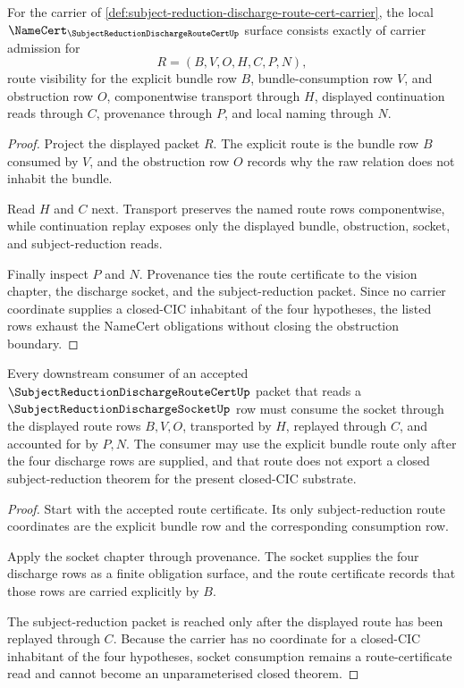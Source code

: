 \begin{theorem}
\label{thm:subject-reduction-discharge-route-cert-obligations}
For the carrier of \autoref{def:subject-reduction-discharge-route-cert-carrier}, the local $\NameCert_{\SubjectReductionDischargeRouteCertUp}$ surface consists exactly of carrier admission for
$$
R=(B,V,O,H,C,P,N),
$$
route visibility for the explicit bundle row $B$, bundle-consumption row $V$, and obstruction row $O$, componentwise transport through $H$, displayed continuation reads through $C$, provenance through $P$, and local naming through $N$.
\end{theorem}
\begin{proof}
Project the displayed packet $R$. The explicit route is the bundle row $B$ consumed by $V$, and the obstruction row $O$ records why the raw relation does not inhabit the bundle.

Read $H$ and $C$ next. Transport preserves the named route rows componentwise, while continuation replay exposes only the displayed bundle, obstruction, socket, and subject-reduction reads.

Finally inspect $P$ and $N$. Provenance ties the route certificate to the vision chapter, the discharge socket, and the subject-reduction packet. Since no carrier coordinate supplies a closed-CIC inhabitant of the four hypotheses, the listed rows exhaust the NameCert obligations without closing the obstruction boundary.
\end{proof}

\begin{theorem}
\label{thm:subject-reduction-discharge-route-cert-socket-consumption}
Every downstream consumer of an accepted $\SubjectReductionDischargeRouteCertUp$ packet that reads a $\SubjectReductionDischargeSocketUp$ row must consume the socket through the displayed route rows $B,V,O$, transported by $H$, replayed through $C$, and accounted for by $P,N$. The consumer may use the explicit bundle route only after the four discharge rows are supplied, and that route does not export a closed subject-reduction theorem for the present closed-CIC substrate.
\end{theorem}
\begin{proof}
Start with the accepted route certificate. Its only subject-reduction route coordinates are the explicit bundle row and the corresponding consumption row.

Apply the socket chapter through provenance. The socket supplies the four discharge rows as a finite obligation surface, and the route certificate records that those rows are carried explicitly by $B$.

The subject-reduction packet is reached only after the displayed route has been replayed through $C$. Because the carrier has no coordinate for a closed-CIC inhabitant of the four hypotheses, socket consumption remains a route-certificate read and cannot become an unparameterised closed theorem.
\end{proof}

